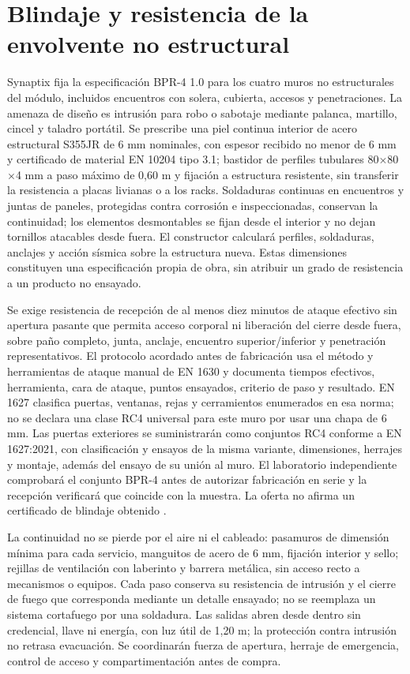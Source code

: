 \section{Blindaje y resistencia de la envolvente no estructural}
\label{sec:recinto-blindaje-rt0602}
Synaptix fija la especificación BPR-4 1.0 para los cuatro muros no estructurales del módulo, incluidos encuentros con solera, cubierta, accesos y penetraciones. La amenaza de diseño es intrusión para robo o sabotaje mediante palanca, martillo, cincel y taladro portátil. Se prescribe una piel continua interior de acero estructural S355JR de 6 mm nominales, con espesor recibido no menor de 6 mm y certificado de material EN 10204 tipo 3.1; bastidor de perfiles tubulares 80$\times$80$\times$4 mm a paso máximo de 0,60 m y fijación a estructura resistente, sin transferir la resistencia a placas livianas o a los racks. Soldaduras continuas en encuentros y juntas de paneles, protegidas contra corrosión e inspeccionadas, conservan la continuidad; los elementos desmontables se fijan desde el interior y no dejan tornillos atacables desde fuera. El constructor calculará perfiles, soldaduras, anclajes y acción sísmica sobre la estructura nueva. Estas dimensiones constituyen una especificación propia de obra, sin atribuir un grado de resistencia a un producto no ensayado.

Se exige resistencia de recepción de al menos diez minutos de ataque efectivo sin apertura pasante que permita acceso corporal ni liberación del cierre desde fuera, sobre paño completo, junta, anclaje, encuentro superior/inferior y penetración representativos. El protocolo acordado antes de fabricación usa el método y herramientas de ataque manual de EN 1630 y documenta tiempos efectivos, herramienta, cara de ataque, puntos ensayados, criterio de paso y resultado. EN 1627 clasifica puertas, ventanas, rejas y cerramientos enumerados en esa norma; no se declara una clase RC4 universal para este muro por usar una chapa de 6 mm. Las puertas exteriores se suministrarán como conjuntos RC4 conforme a EN 1627:2021, con clasificación y ensayos de la misma variante, dimensiones, herrajes y montaje, además del ensayo de su unión al muro. El laboratorio independiente comprobará el conjunto BPR-4 antes de autorizar fabricación en serie y la recepción verificará que coincide con la muestra. La oferta no afirma un certificado de blindaje obtenido \parencite{lote10-bs-en1627}.

La continuidad no se pierde por el aire ni el cableado: pasamuros de dimensión mínima para cada servicio, manguitos de acero de 6 mm, fijación interior y sello; rejillas de ventilación con laberinto y barrera metálica, sin acceso recto a mecanismos o equipos. Cada paso conserva su resistencia de intrusión y el cierre de fuego que corresponda mediante un detalle ensayado; no se reemplaza un sistema cortafuego por una soldadura. Las salidas abren desde dentro sin credencial, llave ni energía, con luz útil de 1,20 m; la protección contra intrusión no retrasa evacuación. Se coordinarán fuerza de apertura, herraje de emergencia, control de acceso y compartimentación antes de compra.


